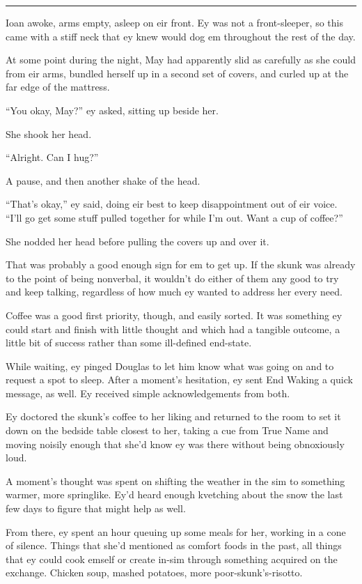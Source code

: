 \begin{center}\rule{0.5\linewidth}{0.5pt}\end{center}

Ioan awoke, arms empty, asleep on eir front. Ey was not a front-sleeper, so this came with a stiff neck that ey knew would dog em throughout the rest of the day.

At some point during the night, May had apparently slid as carefully as she could from eir arms, bundled herself up in a second set of covers, and curled up at the far edge of the mattress.

``You okay, May?'' ey asked, sitting up beside her.

She shook her head.

``Alright. Can I hug?''

A pause, and then another shake of the head.

``That's okay,'' ey said, doing eir best to keep disappointment out of eir voice. ``I'll go get some stuff pulled together for while I'm out. Want a cup of coffee?''

She nodded her head before pulling the covers up and over it.

That was probably a good enough sign for em to get up. If the skunk was already to the point of being nonverbal, it wouldn't do either of them any good to try and keep talking, regardless of how much ey wanted to address her every need.

Coffee was a good first priority, though, and easily sorted. It was something ey could start and finish with little thought and which had a tangible outcome, a little bit of success rather than some ill-defined end-state.

While waiting, ey pinged Douglas to let him know what was going on and to request a spot to sleep. After a moment's hesitation, ey sent End Waking a quick message, as well. Ey received simple acknowledgements from both.

Ey doctored the skunk's coffee to her liking and returned to the room to set it down on the bedside table closest to her, taking a cue from True Name and moving noisily enough that she'd know ey was there without being obnoxiously loud.

A moment's thought was spent on shifting the weather in the sim to something warmer, more springlike. Ey'd heard enough kvetching about the snow the last few days to figure that might help as well.

From there, ey spent an hour queuing up some meals for her, working in a cone of silence. Things that she'd mentioned as comfort foods in the past, all things that ey could cook emself or create in-sim through something acquired on the exchange. Chicken soup, mashed potatoes, more poor-skunk's-risotto.

